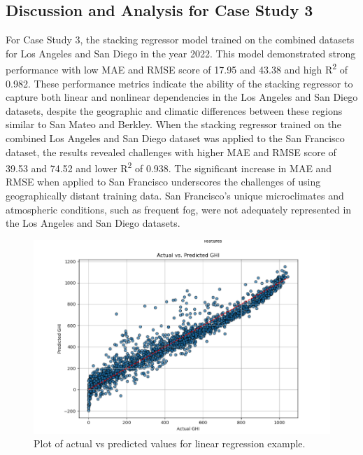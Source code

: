 \documentclass[10pt,twocolumn]{article}
\begin{document}
\begin{itemize}
\subsection{Discussion and Analysis for Case Study 3}
For Case Study 3, the stacking regressor model trained on the combined datasets for Los Angeles and San Diego in the year 2022. This model demonstrated strong performance with low MAE and RMSE score of 17.95 and 43.38 and high R\textsuperscript{2} of 0.982. These performance metrics  indicate the ability of the stacking regressor to capture both linear and nonlinear dependencies in the Los Angeles and San Diego datasets, despite the geographic and climatic differences between these regions similar to San Mateo and Berkley. 
When the stacking regressor trained on the combined Los Angeles and San Diego dataset was applied to the San Francisco dataset, the results revealed challenges with higher MAE and RMSE score of 39.53 and 74.52 and lower R\textsuperscript{2} of 0.938. The significant increase in MAE and RMSE when applied to San Francisco underscores the challenges of using geographically distant training data. San Francisco's unique microclimates and atmospheric conditions, such as frequent fog, were not adequately represented in the Los Angeles and San Diego datasets.
\begin{figure}
            \centering
            \includegraphics[width=1\linewidth]{ActualvsPredictedlinreg.png}
            \caption{Plot of actual vs predicted values for linear regression example.}
            \label{fig:enter-label}
        \end{figure}
         

\end{itemize}
\end{document}
